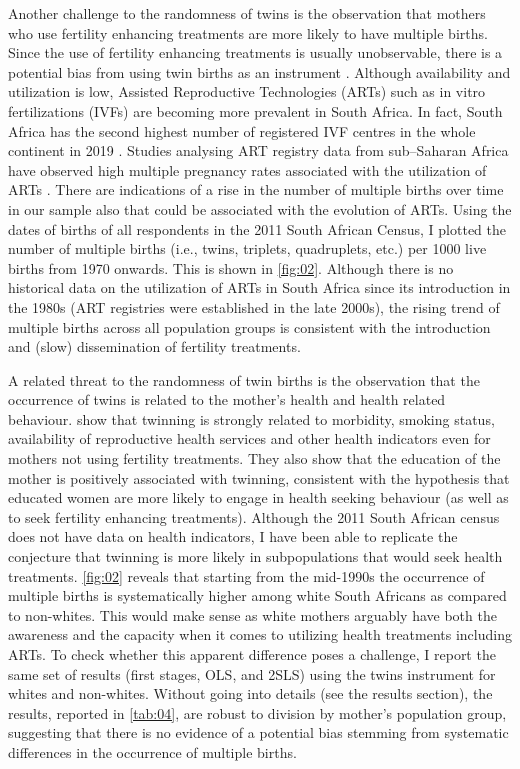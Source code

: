 Another challenge to the randomness of twins is the observation that mothers who use fertility enhancing treatments are more likely to have multiple births. Since the use of fertility enhancing treatments is usually unobservable, there is a potential bias from using twin births as an instrument \parencite{braakmann_reconsidering_2016}. Although availability and utilization is low, Assisted Reproductive Technologies (ARTs) such as in vitro fertilizations (IVFs) are becoming more prevalent in South Africa. In fact, South Africa has the second highest number of registered IVF centres in the whole continent in 2019 \parencite{ombelet_ivf_nodate}. Studies analysing ART registry data from sub–Saharan Africa have observed high multiple pregnancy rates associated with the utilization of ARTs \parencite{Botha2018,Dyer2019}. There are indications of a rise in the number of multiple births over time in our sample also that could be associated with the evolution of ARTs. Using the dates of births of all respondents in the 2011 South African Census, I plotted the number of multiple births (i.e., twins, triplets, quadruplets, etc.) per 1000 live births from 1970 onwards. This is shown in \autoref{fig:02}. Although there is no historical data on the utilization of ARTs in South Africa since its introduction in the 1980s (ART registries were established in the late 2000s), the rising trend of multiple births across all population groups is consistent with the introduction and (slow) dissemination of fertility treatments. 

A related threat to the randomness of twin births is the observation that the occurrence of twins is related to the mother's health and health related behaviour. \textcite{bhalotra_twin_2019} show that twinning is strongly related to morbidity, smoking status, availability of reproductive health services and other health indicators even for mothers not using fertility treatments. They also show that the education of the mother is positively associated with twinning, consistent with the hypothesis that educated women are more likely to engage in health seeking behaviour (as well as to seek fertility enhancing treatments). Although the 2011 South African census does not have data on health indicators, I have been able to replicate the conjecture that twinning is more likely in subpopulations that would seek health treatments. \autoref{fig:02} reveals that starting from the mid-1990s the occurrence of multiple births is systematically higher among white South Africans as compared to non-whites. This would make sense as white mothers arguably have both the awareness and the capacity when it comes to utilizing health treatments including ARTs. To check whether this apparent difference poses a challenge, I report the same set of results (first stages, OLS, and 2SLS) using the twins instrument for whites and non-whites. Without going into details (see the results section), the results, reported in \autoref{tab:04}, are robust to division by mother's population group, suggesting that there is no evidence of a potential bias stemming from systematic differences in the occurrence of multiple births.

